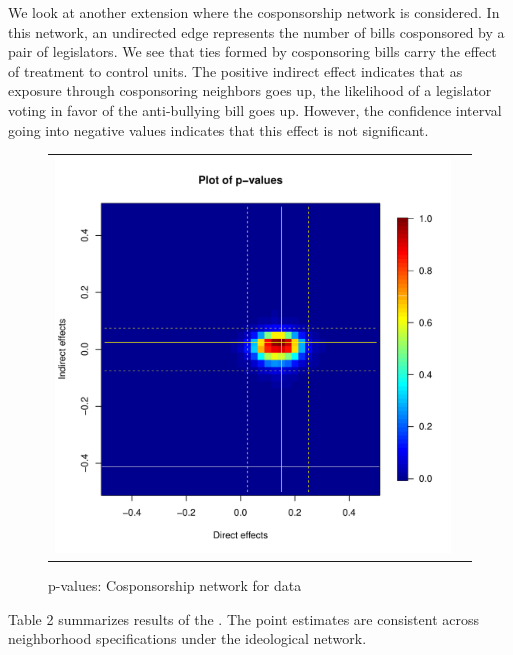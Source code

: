 \documentclass[12pt]{article}
\begin{document}
We look at another extension where the cosponsorship network is considered. In this network, an undirected edge represents the number of bills cosponsored by a pair of legislators. We see that ties formed by cosponsoring bills carry the effect of treatment to control units. The positive indirect effect indicates that as exposure through cosponsoring neighbors goes up, the likelihood of a legislator voting in favor of the anti-bullying bill goes up. However, the confidence interval going into negative values indicates that this effect is not significant.

\begin{figure}
	\centering
	\begin{tabular}{cc}
	\includegraphics[scale=0.45]{./images/pval_plot_bergan_cospon.pdf}
	\end{tabular}
	\caption{p-values: Cosponsorship network for \citet{bergan2015call} data}
\end{figure}


Table 2 summarizes results of the \citet{bergan2015call}.  The point estimates are consistent across neighborhood specifications under the ideological network.
\end{document}
